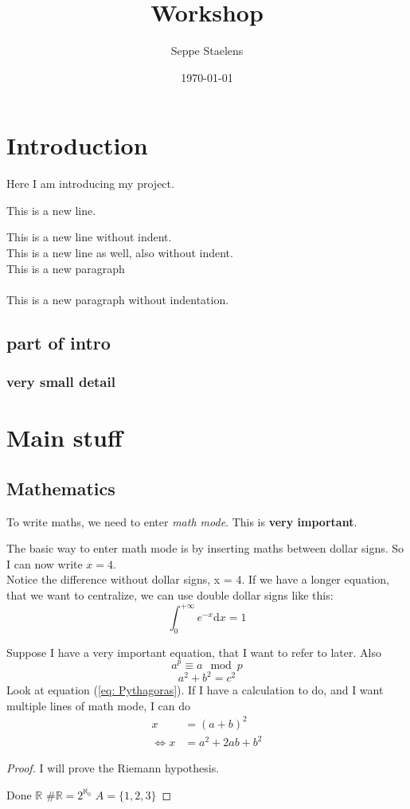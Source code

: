 \documentclass{article}
\title{Workshop}
\author{Seppe Staelens}
\date{\today}
\begin{document}
\maketitle

\section{Introduction}

Here I am introducing my project.

This is a new line.

\noindent This is a new line without indent.\\
This is a new line as well, also without indent.\\

This is a new paragraph\\
\\
This is a new paragraph without indentation.

\subsection{part of intro}

\subsubsection{very small detail}

\section{Main stuff}

\subsection{Mathematics}

To write maths, we need to enter \textit{math mode}. This is \textbf{very important}.

The basic way to enter math mode is by inserting maths between dollar signs. So I can now write $x = 4$. \\
Notice the difference without dollar signs, x = 4. If we have a longer equation, that we want to centralize, we can use double dollar signs like this:
$$\int_0^{+\infty} e^{-x} \text{d} x = 1$$

Suppose I have a very important equation, that I want to refer to later.
Also
\begin{equation}
    a^p \equiv a \mod p
\end{equation}
\begin{equation}\label{eq: Pythagoras}
    a^2 + b^2 = c^2
\end{equation}
Look at equation (\ref{eq: Pythagoras}).
\newpage
If I have a calculation to do, and I want multiple lines of math mode, I can do
\begin{align*}
    x & = (a+b)^2 \\
    \Leftrightarrow x & = a^2 + 2ab + b^2
\end{align*}

\begin{proof}
    I will prove the Riemann hypothesis.

    Done
    $\mathbb{R}$ $\# \mathbb{R} = 2^{\aleph_0}$
    $A = \{1,2,3\}$
\end{proof}
\end{document}
